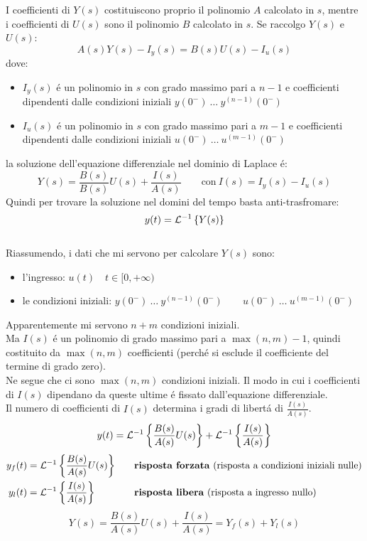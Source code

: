 \documentclass[../main.tex]{subfiles}
\begin{document}
	I coefficienti di $ Y(s) $ costituiscono proprio il polinomio $ A $ calcolato in $ s $, mentre i coefficienti di $ U(s) $ sono il polinomio $ B $ calcolato in $ s $. Se raccolgo $ Y(s) $ e $ U(s) $:
	\[ A(s) Y(s) - I_y(s) = B(s) U(s) - I_u(s) \]
	dove:
	\begin{itemize}
		\item $ I_y(s) $ \'{e} un polinomio in $ s $ con grado massimo pari a $ n-1 $ e coefficienti dipendenti dalle condizioni iniziali $ y(0^-)\ \dots\ y^{(n-1)}(0^-) $
		\item $ I_u(s) $ \'{e} un polinomio in $ s $ con grado massimo pari a $ m-1 $ e coefficienti dipendenti dalle condizioni iniziali $ u(0^-)\ \dots\ u^{(m-1)}(0^-) $
	\end{itemize}
	la soluzione dell'equazione differenziale nel dominio di Laplace \'{e}:
	\begin{equation}
		Y(s) = \frac{B(s)}{B(s)} U(s) + \frac{I(s)}{A(s)} \qquad \text{con}\: I(s) = I_y(s) - I_u(s) 
	\end{equation}
	Quindi per trovare la soluzione nel domini del tempo basta anti-trasfromare:
	\[ y(t) = \mathcal{L}^{-1} \left\lbrace Y(s) \right\rbrace \]
	\smallskip\\
	Riassumendo, i dati che mi servono per calcolare $ Y(s) $ sono:
	\begin{itemize}
		\item l'ingresso: $ u(t) \quad t \in [0, +\infty) $
		\item le condizioni iniziali: $ y(0^-)\ \dots\ y^{(n-1)}(0^-) \qquad u(0^-)\ \dots\ u^{(m-1)}(0^-) $ 
	\end{itemize}
	Apparentemente mi servono $ n+m $ condizioni iniziali.\\
	Ma $ I(s) $ \'{e} un polinomio di grado massimo pari a $ \max(n,m) - 1 $, quindi costituito da $ \max(n,m) $ coefficienti (perch\'{e} si esclude il coefficiente del termine di grado zero).\\
	Ne segue che ci sono $ \max(n,m) $ condizioni iniziali. Il modo in cui i coefficienti di $ I(s) $ dipendano da queste ultime \'{e} fissato dall'equazione differenziale.
	\smallskip\\
	Il numero di coefficienti di $ I(s) $ determina i gradi di libert\'{a} di $ \frac{I(s)}{A(s)} $.
	\[ y(t) = \mathcal{L}^{-1} \left\lbrace  \frac{B(s)}{A(s)} U(s)  \right\rbrace + \mathcal{L}^{-1} \left\lbrace  \frac{I(s)}{A(s)}  \right\rbrace\]
	\begin{align*}
		y_f(t) &= \mathcal{L}^{-1} \left\lbrace  \frac{B(s)}{A(s)} U(s)  \right\rbrace \quad &&\text{\textbf{risposta forzata} (risposta a condizioni iniziali nulle)}\\
		y_l(t) &= \mathcal{L}^{-1} \left\lbrace  \frac{I(s)}{A(s)}  \right\rbrace \quad &&\text{\textbf{risposta libera} (risposta a ingresso nullo)}
	\end{align*}
	\[ Y(s) = \frac{B(s)}{A(s)} U(s) + \frac{I(s)}{A(s)} = Y_f(s) + Y_l(s) \]	
\end{document}
